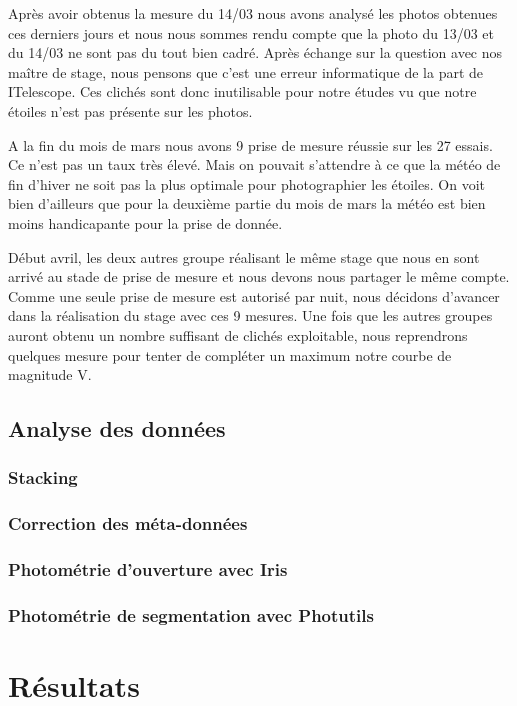 \documentclass[10pt,french, openany]{book}
\begin{document}
Après avoir obtenus la mesure du 14/03 nous avons analysé les photos obtenues ces derniers jours et nous nous sommes rendu compte que la photo du 13/03 et du 14/03 ne sont pas du tout bien cadré. Après échange sur la question avec nos maître de stage, nous pensons que c'est une erreur informatique de la part de ITelescope. Ces clichés sont donc inutilisable pour notre études vu que notre étoiles n'est pas présente sur les photos. 

A la fin du mois de mars nous avons 9 prise de mesure réussie sur les 27 essais. Ce n'est pas un taux très élevé. Mais on pouvait s'attendre à ce que la météo de fin d'hiver ne soit pas la plus optimale pour photographier les étoiles. On voit bien d'ailleurs que pour la deuxième partie du mois de mars la météo est bien moins handicapante pour la prise de donnée.

Début avril, les deux autres groupe réalisant le même stage que nous en sont arrivé au stade de prise de mesure et nous devons nous partager le même compte. Comme une seule prise de mesure est autorisé par nuit, nous décidons d'avancer dans la réalisation du stage avec ces 9 mesures. Une fois que les autres groupes auront obtenu un nombre suffisant de clichés exploitable, nous reprendrons quelques mesure pour tenter de compléter un maximum notre courbe de magnitude V.

\section{Analyse des données}
    \subsection{Stacking}
    \subsection{Correction des méta-données}
    \subsection{Photométrie d'ouverture avec Iris}
    \subsection{Photométrie de segmentation avec Photutils}
\chapter{Résultats}\label{chapt:model}

\pagebreak

\printbibheading[heading=bibintoc,title={Bibliographie}]
\printbibliography[type=inbook,heading=subbibliography,title={Livres}]
\printbibliography[type=book,heading=subbibliography,title={Livres}]
\printbibliography[type=article,heading=subbibliography,title={Articles}]
\printbibliography[type=online,heading=subbibliography,title={Sites internet}]
\printbibliography[nottype=book, nottype = inbook, nottype = article, nottype = online,heading=subbibliography,title={Autres sources}]
\end{document}

